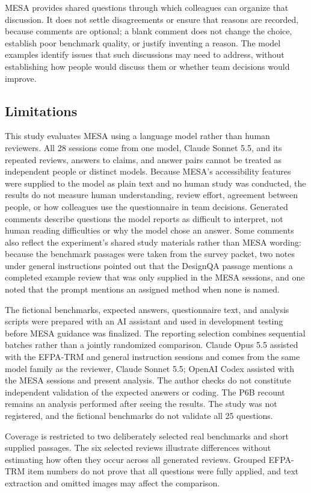 \documentclass[10pt,conference]{IEEEtran}
\begin{document}
MESA provides shared questions through which colleagues can organize that discussion. It does not settle disagreements or ensure that reasons are recorded, because comments are optional; a blank comment does not change the choice, establish poor benchmark quality, or justify inventing a reason. The model examples identify issues that such discussions may need to address, without establishing how people would discuss them or whether team decisions would improve.

\subsection{Limitations}
This study evaluates MESA using a language model rather than human reviewers. All 28 sessions come from one model, Claude Sonnet 5.5, and its repeated reviews, answers to claims, and answer pairs cannot be treated as independent people or distinct models. Because MESA's accessibility features were supplied to the model as plain text and no human study was conducted, the results do not measure human understanding, review effort, agreement between people, or how colleagues use the questionnaire in team decisions. Generated comments describe questions the model reports as difficult to interpret, not human reading difficulties or why the model chose an answer. Some comments also reflect the experiment's shared study materials rather than MESA wording: because the benchmark passages were taken from the survey packet, two notes under general instructions pointed out that the DesignQA passage mentions a completed example review that was only supplied in the MESA sessions, and one noted that the prompt mentions an assigned method when none is named.

The fictional benchmarks, expected answers, questionnaire text, and analysis scripts were prepared with an AI assistant and used in development testing before MESA guidance was finalized. The reporting selection combines sequential batches rather than a jointly randomized comparison. Claude Opus 5.5 assisted with the EFPA-TRM and general instruction sessions and comes from the same model family as the reviewer, Claude Sonnet 5.5; OpenAI Codex assisted with the MESA sessions and present analysis. The author checks do not constitute independent validation of the expected answers or coding. The P6B recount remains an analysis performed after seeing the results. The study was not registered, and the fictional benchmarks do not validate all 25 questions.

Coverage is restricted to two deliberately selected real benchmarks and short supplied passages. The six selected reviews illustrate differences without estimating how often they occur across all generated reviews. Grouped EFPA-TRM item numbers do not prove that all questions were fully applied, and text extraction and omitted images may affect the comparison.
\end{document}
